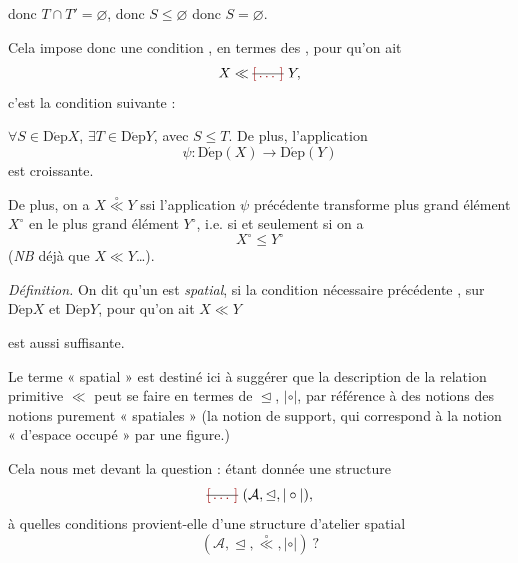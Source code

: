 \documentclass[11pt,a4paper]{article}
\begin{document}

donc $T \cap T' = \varnothing$, donc $S \leq \varnothing$ donc
$S = \varnothing$.

Cela impose donc une condition , en termes des
 , pour qu'on ait
\[
  X \ll \text{\struck{\ill{}}}\ Y ,
\]
c'est la condition suivante :

 \quad $\forall S \in \operatorname{D\acute{e}p} X$,
$\exists T \in \operatorname{D\acute{e}p} Y$, avec
 $S \leq T$. De plus,
l'application
\[
  \psi : \operatorname{D\acute{e}p}(X) \longrightarrow \operatorname{D\acute{e}p}(Y)
\]
est croissante.

De plus, on a $X \overset{\circ}{\ll} Y$ ssi l'application $\psi$ précédente
transforme  plus grand élément $X^{\circ}$ en le plus
grand élément $Y^{\circ}$, i.e. si et seulement si on a \struck{$\ll$}
\[
  X^{\circ} \leq Y^{\circ}
\]
(\emph{NB} \ill{}  déjà que $X \ll Y$…).

\emph{Définition.} On dit qu'un   est
\emph{spatial}, si la condition nécessaire précédente ,
sur $\operatorname{D\acute{e}p} X$ et $\operatorname{D\acute{e}p} Y$, pour
qu'on ait $X \ll Y$



est aussi suffisante.

Le terme « spatial »  est destiné ici à suggérer que la
description de la relation primitive $\ll$ peut se faire en termes de
$\trianglelefteq$, $\mathrel{|\circ|}$, par référence à des notions des notions
purement « spatiales » (la notion de support, qui 
correspond à la notion « d'espace occupé » par une figure.)

Cela nous met devant la question : étant donnée une structure
\[
  \text{\struck{\ill{}}}\ (\mathcal{A}, \trianglelefteq, \mathrel{|\circ|}) ,
\]
à quelles conditions provient-elle d'une structure d'atelier spatial
\[
  (\mathcal{A}, \trianglelefteq, \overset{\circ}{\ll}, \mathrel{|\circ|}) \ ?
\]
\end{document}
